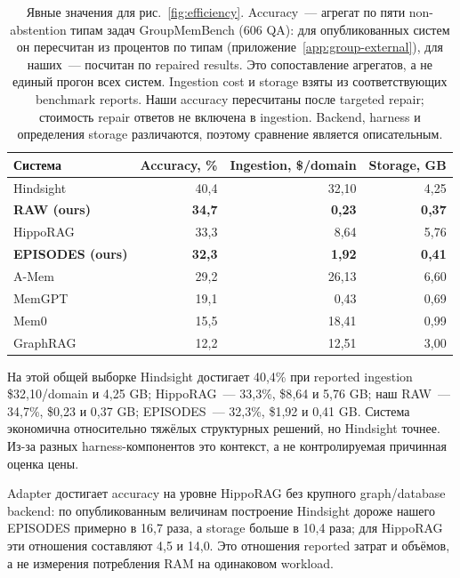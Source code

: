 \documentclass[11pt,a4paper]{article}
\newcommand{\raw}{RAW}
\newcommand{\episodes}{EPISODES}
\begin{document}
\begin{table}[ht]
\centering
\small
\begin{tabular}{@{}lrrr@{}}
\toprule
Система & Accuracy, \% & Ingestion, \$/domain & Storage, GB \\
\midrule
Hindsight & 40{,}4 & 32{,}10 & 4{,}25 \\
\textbf{\raw{} (ours)} & \textbf{34{,}7} & \textbf{0{,}23} & \textbf{0{,}37} \\
HippoRAG & 33{,}3 & 8{,}64 & 5{,}76 \\
\textbf{\episodes{} (ours)} & \textbf{32{,}3} & \textbf{1{,}92} & \textbf{0{,}41} \\
A-Mem & 29{,}2 & 26{,}13 & 6{,}60 \\
MemGPT & 19{,}1 & 0{,}43 & 0{,}69 \\
Mem0 & 15{,}5 & 18{,}41 & 0{,}99 \\
GraphRAG & 12{,}2 & 12{,}51 & 3{,}00 \\
\bottomrule
\end{tabular}
\caption{Явные значения для рис.~\ref{fig:efficiency}. Accuracy~--- агрегат по пяти
non-abstention типам задач GroupMemBench (606 QA): для опубликованных систем он
пересчитан из процентов по типам (приложение~\ref{app:group-external}), для наших~---
посчитан по repaired results. Это сопоставление агрегатов, а не единый прогон всех
систем. Ingestion cost и storage взяты из соответствующих benchmark reports. Наши accuracy пересчитаны после targeted repair; стоимость
repair ответов не включена в ingestion. Backend, harness и определения storage
различаются, поэтому сравнение является описательным.}
\label{tab:efficiency}
\end{table}

На этой общей выборке Hindsight достигает 40{,}4\% при reported ingestion
\$32,10/domain и 4,25 GB; HippoRAG~--- 33,3\%, \$8{,}64 и 5{,}76 GB;
наш \raw{}~--- 34{,}7\%, \$0,23 и 0,37 GB; \episodes{}~--- 32,3\%, \$1{,}92 и
0{,}41 GB. Система экономична относительно тяжёлых структурных решений, но
Hindsight точнее. Из-за разных harness-компонентов это контекст, а не
контролируемая причинная оценка цены.

Adapter достигает accuracy на уровне HippoRAG без крупного graph/database
backend: по опубликованным величинам построение Hindsight дороже нашего
\episodes{} примерно в 16{,}7 раза, а storage больше в 10{,}4 раза; для HippoRAG
эти отношения составляют 4{,}5 и 14{,}0. Это отношения reported затрат и объёмов,
а не измерения потребления RAM на одинаковом workload.
\end{document}
